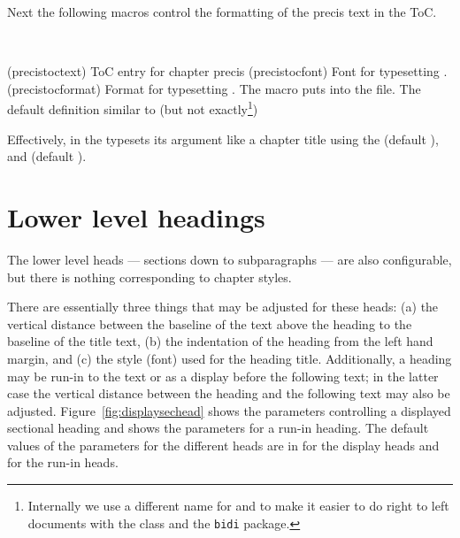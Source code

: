 Next the following macros control the formatting of the precis text in
the ToC.
\begin{syntax}
\cmd{\precistoctext} \cmd{\precistocfont} \cmd{\precistocformat} \\
\end{syntax}
\glossary(precistoctext)%
  {}%
  {ToC entry for chapter precis }
\glossary(precistocfont)%
  {}%
  {Font for typesetting .}
\glossary(precistocformat)%
  {}%
  {Format for typesetting .}
The \cmd{\chapterprecistoc} macro puts \cmd{\precistoctext} into 
the  file. The default definition similar to (but not
exactly\footnote{Internally we use a different name for 
  and  to make it easier to do right to left documents
with the class and the \texttt{bidi} package.})
\begin{lcode}
\DeclareRobustCommand{\precistoctext}[1]{%
  {\nopagebreak\leftskip \cftchapterindent\relax
    \advance\leftskip \cftchapternumwidth\relax
    \rightskip \@tocrmarg\relax
    \precistocformat\precistocfont #1\par}}
\end{lcode}
Effectively, in the \toc{} \cmd{\precistoctext} typesets its argument like 
a chapter title using the \cmd{\precistocfont} (default
\cmd{\itshape}), and \cmd{\precistocformat} (default \cmd{\noindent}).



\section{Lower level headings}


    The lower level heads --- sections down to subparagraphs --- are also
configurable, but there is nothing corresponding to chapter styles.

    There are essentially three things that may be adjusted for these heads:
(a) the vertical distance between the baseline of the text above the heading to
the baseline of the title text, (b) the indentation of the heading from the
left hand margin, and (c) the style (font) used for the 
heading title. 
Additionally, a heading may be run-in to the text or as a display before 
the following text;
in the latter case the vertical distance between the heading and the 
following text may also be adjusted. Figure~\ref{fig:displaysechead} shows the
parameters controlling a displayed sectional heading and 
shows the parameters for a run-in heading. The default values of the
parameters for the different heads are in  for
the display heads and  for the run-in heads.


